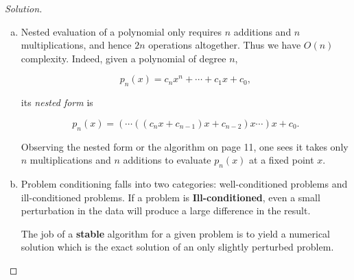 \documentclass[12pt,a4]{article}
\theoremstyle{definition}
\begin{document}
\begin{proof}[Solution]
\begin{enumerate}[(a)]
		\item Nested evaluation of a polynomial only requires $n$ additions and $n$ multiplications, and hence $2n$ operations altogether. Thus we have $O(n)$ complexity. Indeed, given a polynomial of degree $n$, 
		
		\[
		p_n(x) = c_n x^n + \cdots + c_1 x + c_0 {,}
		\]
		
		\noindent its \emph{nested form} is 
		
		\[
		p_n(x) = (\cdots ((c_n x + c_{n - 1}) x + c_{n - 2}) x \cdots) x + c_0 {.}
		\]
		
		\noindent Observing the nested form or the algorithm on page 11, one sees it takes only $n$ multiplications and $n$ additions to evaluate $p_n(x)$ at a fixed point $x$. 
		
		\item Problem conditioning falls into two categories: well-conditioned problems and ill-conditioned problems. If a problem is \textbf{Ill-conditioned}, even a small perturbation in the data will produce a large difference in the result. 
		
		The job of a \textbf{stable} algorithm for a given problem is to yield a numerical solution which is the exact solution of an only slightly perturbed problem. 
		
	\end{enumerate}
\end{proof}
\end{document}
